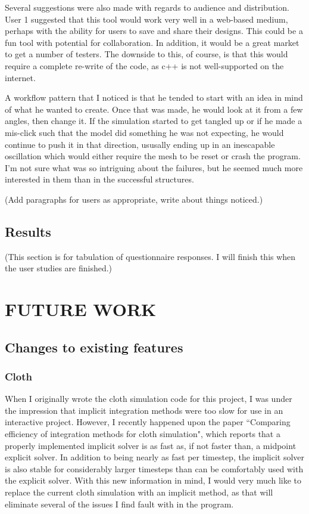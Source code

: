 \documentclass{thesis}
\begin{document}
Several suggestions were also made with regards to audience and distribution.  User 1 suggested that this tool would work very well in
a web-based medium, perhaps with the ability for users to save and share their designs.  This could be a fun tool with potential for
collaboration.  In addition, it would be a great market to get a number of testers.  The downside to this, of course, is that this
would require a complete re-write of the code, as c++ is not well-supported on the internet.

A workflow pattern that I noticed is that he tended to start with an idea in mind of what he wanted to create.  Once that was made,
he would look at it from a few angles, then change it.  If the simulation started to get tangled up or if he made a mis-click
such that the model did something he was not expecting, he would continue to push it in that direction, ususally ending up in an
inescapable oscillation which would either require the mesh to be reset or crash the program.  I'm not sure what was so intriguing
about the failures, but he seemed much more interested in them than in the successful structures.

(Add paragraphs for users as appropriate, write about things noticed.)

\section{Results}
(This section is for tabulation of questionnaire responses.  I will finish this when the user studies are finished.)


\chapter{FUTURE WORK}

\section{Changes to existing features}

\subsection{Cloth}
When I originally wrote the cloth simulation code for this project, I was under the impression that implicit integration methods were
too slow for use in an interactive project.  However, I recently happened upon the paper ``Comparing efficiency of integration methods
for cloth simulation"\cite{volino01comparingefficiency}\nocite{volino00fastcloth}, which reports that a properly implemented implicit
solver is as fast as, if not faster than, a midpoint explicit solver.  In addition to being nearly as fast per timestep, the implicit
solver is also stable for considerably larger timesteps than can be comfortably used with the explicit solver.  With this new
information in mind, I would very much like to replace the current cloth simulation with an implicit method, as that will eliminate
several of the issues I find fault with in the program.
\end{document}
